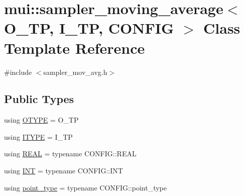 \hypertarget{classmui_1_1sampler__moving__average}{}\section{mui\+:\+:sampler\+\_\+moving\+\_\+average$<$ O\+\_\+\+TP, I\+\_\+\+TP, C\+O\+N\+F\+IG $>$ Class Template Reference}
\label{classmui_1_1sampler__moving__average}


{\ttfamily \#include $<$sampler\+\_\+mov\+\_\+avg.\+h$>$}

\subsection*{Public Types}
\begin{DoxyCompactItemize}
\item 
using \hyperlink{classmui_1_1sampler__moving__average_af5b1ae5cd60a907dbbd1f3fe978263dd}{O\+T\+Y\+PE} = O\+\_\+\+TP
\item 
using \hyperlink{classmui_1_1sampler__moving__average_a93946e297f6a01f4aad6297d4dc55662}{I\+T\+Y\+PE} = I\+\_\+\+TP
\item 
using \hyperlink{classmui_1_1sampler__moving__average_ace3d3dadc4a7ed5724076533634e6c41}{R\+E\+AL} = typename C\+O\+N\+F\+I\+G\+::\+R\+E\+AL
\item 
using \hyperlink{classmui_1_1sampler__moving__average_a9c2d6ff0743c06447c3224c32870d872}{I\+NT} = typename C\+O\+N\+F\+I\+G\+::\+I\+NT
\item 
using \hyperlink{classmui_1_1sampler__moving__average_ae687f5cbf78af76e22bf97845f386300}{point\+\_\+type} = typename C\+O\+N\+F\+I\+G\+::point\+\_\+type
\end{DoxyCompactItemize}
